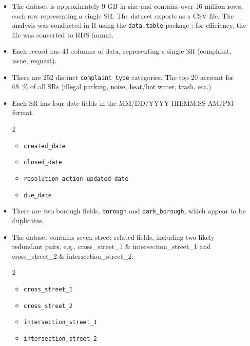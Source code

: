 \documentclass[linenumber]{jdsart}
\begin{document}
\begin{itemize}[left=1.5em, itemsep=0.25\baselineskip]
\item The dataset is approximately \num{9} GB in size and contains 
over \num{16} million rows, each row representing a single 
SR. The dataset exports as a CSV file. The analysis was conducted in
R \citep{R2025} using the \texttt{data.table} package
\citep{datatable2025}; for efficiency, the file was converted to
RDS format.

\item Each record has \num{41} columns of data, representing 
a single SR (complaint, issue, request). 

\item There are \num{252} distinct \texttt{complaint\_type} categories.
The top \num{20} account for \SI{68}{\percent} of all SRs (illegal parking, noise, heat/hot water, trash, etc.)
	
\item Each SR has four date fields in the MM/DD/YYYY HH:MM:SS AM/PM format.

\begin{multicols}{2}
\begin{itemize}[label=\textbullet]
  \item \texttt{created\_date}
  \item \texttt{closed\_date}
  \item \texttt{resolution\_action\_updated\_date}
  \item \texttt{due\_date}
\end{itemize}
\end{multicols}

\item There are two borough fields, \texttt{borough} and \texttt{park\_borough}, 
		which appear to be duplicates.
  
\item The dataset contains seven street-related fields, including 
two likely redundant pairs, e.g., cross\_street\_1 \& intersection\_street\_1 and
cross\_street\_2 \& intersection\_street\_2. 

\begin{multicols}{2}
\begin{itemize}[label=\textbullet, itemsep=1.25pt]
    \item \texttt{cross\_street\_1}
    \item \texttt{cross\_street\_2}
    \vspace{5pt}

    \item \texttt{intersection\_street\_1}
    \item \texttt{intersection\_street\_2}
    \vspace{5pt}


\end{itemize}
\end{multicols}
\end{itemize}
\end{document}
